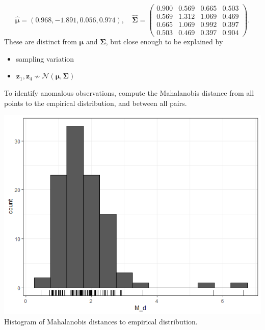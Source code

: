 \documentclass[20pt,landscape,footrule,headrule]{foils}
\begin{document}
\small $$\mathbf{\hat{\mu}}=(0.968, -1.891,0.056,0.974),\quad \mathbf{\hat{\Sigma}}=\begin{pmatrix}
0.900 & 0.569 & 0.665 &  0.503 \\
0.569 & 1.312 & 1.069 &  0.469 \\
0.665 & 1.069 & 0.992 &  0.397 \\
0.503 & 0.469 & 0.397 &  0.904 \end{pmatrix}.$$\normalsize
These are distinct from $\mathbf{\mu}$ and $\mathbf{\Sigma}$, but close enough to be explained by 
\begin{itemize}
\item sampling variation
\item $\mathbf{z}_1,\mathbf{z}_4\not\sim \mathcal{N}(\mathbf{\mu},\mathbf{\Sigma})$
\end{itemize}
To identify anomalous observations, compute the Mahalanobis distance from all points to the empirical distribution, and between all pairs.  
\newpage\ \begin{center}
\includegraphics[height=0.8\textheight]{Images/Histogram_Md} \\ Histogram of Mahalanobis distances to empirical distribution.
\end{center}
\end{document}
